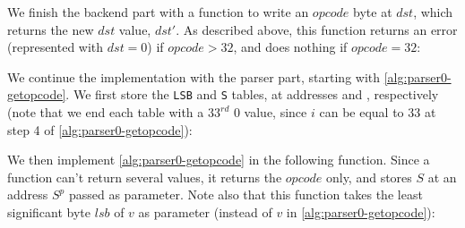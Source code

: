 We finish the backend part with a function to write an $opcode$ byte at $dst$,
which returns the new $dst$ value, $dst'$. As described above, this function
returns an error (represented with $dst=0$) if $opcode>32$, and does nothing if
$opcode=32$:

\bigskip {}
\vspace{-0.9\baselineskip}
\begin{TwoColumns}
\end{TwoColumns}


We continue the implementation with the parser part, starting with
\cref{alg:parser0-getopcode}. We first store the {\tt LSB} and {\tt S} tables,
at addresses  and
, respectively (note that we end each
table with a $33^{rd}$ 0 value, since $i$ can be equal to 33 at step 4 of
\cref{alg:parser0-getopcode}):


We then implement \cref{alg:parser0-getopcode} in the following function. Since
a function can't return several values, it returns the $opcode$ only, and
stores $S$ at an address $S^p$ passed as parameter. Note also that this
function takes the least significant byte $lsb$ of $v$ as parameter (instead of
$v$ in \cref{alg:parser0-getopcode}):


